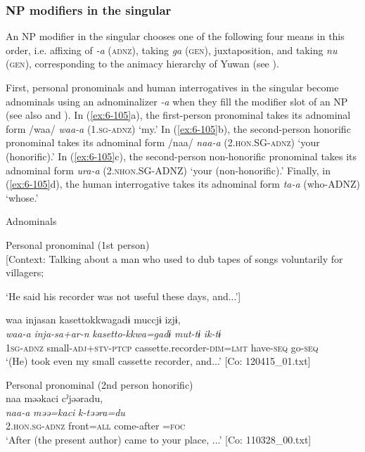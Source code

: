 \subsubsection{NP modifiers in the singular}

An NP modifier in the singular chooses one of the following four means in this order, i.e. affixing of \textit{-a} (\textsc{adnz}), taking \textit{ga} (\textsc{gen}), juxtaposition, and taking \textit{nu} (\textsc{gen}), corresponding to the animacy hierarchy of Yuwan (see ).

First, personal pronominals and human interrogatives in the singular become adnominals using an adnominalizer \textit{-a} when they fill the modifier slot of an NP (see also  and ). In (\ref{ex:6-105}a), the first-person pronominal takes its adnominal form /waa/ \textit{waa-a} (1.\textsc{sg}-\textsc{adnz}) ‘my.’ In (\ref{ex:6-105}b), the second-person honorific pronominal takes its adnominal form /naa/ \textit{naa-a} (2.\textsc{hon}.SG-\textsc{adnz}) ‘your (honorific).’ In (\ref{ex:6-105}c), the second-person non-honorific pronominal takes its adnominal form \textit{ura-a} (2.\textsc{nhon}.SG-ADNZ) ‘your (non-honorific).’ Finally, in (\ref{ex:6-105}d), the human interrogative takes its adnominal form \textit{ta-a} (who-ADNZ) ‘whose.’

\ea\label{ex:6-105}
  Adnominals

 \ea Personal pronominal (1st person)\\{}
[Context: Talking about a man who used to dub tapes of songs voluntarily for villagers;

{\TM} ‘He said his recorder was not useful these days, and...’]

{\TM}
\glll waa  injasan  {\textbar}kasetto{\textbar}kkwagadɨ      muccjɨ  izjɨ,\\
      \textit{waa-a}  \textit{inja-sa+ar-n}\textsubscript{} \textit{kasetto-kkwa=gadɨ}    \textit{mut-tɨ}  \textit{ik-tɨ}\\
      1\textsc{sg}-\textsc{adnz}  small-\textsc{adj}+\textsc{stv}-\textsc{ptcp}  cassette.recorder-\textsc{dim}=\textsc{lmt}      have-\textsc{seq}  go-\textsc{seq}\\
\glt ‘(He) took even my small cassette recorder, and...’ [Co: 120415\_01.txt]

\ex Personal pronominal (2nd person honorific)\\
{\TM}
\glll  naa  məəkaci  cˀjəəradu,\\
\textit{naa-a}  \textit{məə=kaci}  \textit{k-təəra=du}\\
2.\textsc{hon}.\textsc{sg}-\textsc{adnz}  front=\textsc{all}  come-after =\textsc{foc}\\
\glt ‘After (the present author) came to your place, ...’ [Co: 110328\_00.txt]

